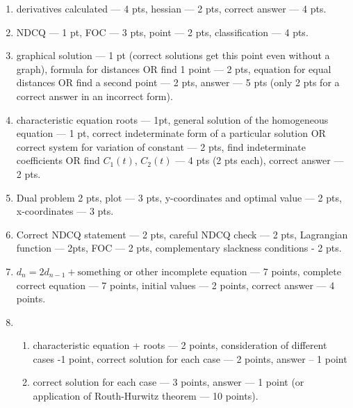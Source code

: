 \begin{enumerate}
  \item derivatives calculated — 4 pts, hessian — 2 pts, correct answer — 4 pts.
  
  \item NDCQ — 1 pt, FOC — 3 pts, point — 2 pts, classification — 4 pts.
  \item  graphical solution — 1 pt (correct solutions get this point even without a graph), 
  formula for distances OR find 1 point — 2 pts, equation for equal distances OR find a second point — 2 pts, answer — 5 pts (only 2 pts for a correct answer in an incorrect form).
   \item  characteristic equation roots — 1pt, general solution of the homogeneous equation — 1 pt, correct indeterminate form of a particular solution OR correct system for variation of constant — 2 pts, find indeterminate coefficients OR find $C_1(t)$, $C_2(t)$ — 4 pts (2 pts each), correct answer — 2 pts.
  \item Dual problem  2 pts, plot — 3 pts, y-coordinates and optimal value — 2 pts, x-coordinates — 3 pts.

  \item Correct NDCQ statement — 2 pts, careful NDCQ check — 2 pts, Lagrangian function — 2pts, FOC — 2 pts, complementary slackness conditions - 2 pts.
  
  \item $d_n=2d_{n-1} + \text{something}$ or other incomplete equation — 7 points,  
  complete correct equation — 7 points,  initial values — 2 points, correct answer — 4 points.

\item \begin{enumerate}
  \item characteristic equation + roots — 2 points, consideration of different cases -1 point, correct solution for each case — 2 points, answer – 1 point
  \item  correct solution for each case — 3 points, answer — 1 point (or application of Routh-Hurwitz theorem — 10 points).
\end{enumerate}


\end{enumerate}